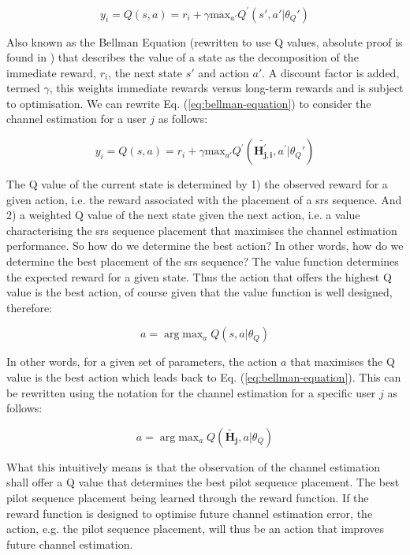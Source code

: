 \begin{equation}\label{eq:bellman-equation}
    y_i = Q(s, a) = r_i + \gamma \text{max}_{a'} Q^{'}(s', a' | \theta_Q')
\end{equation}

Also known as the Bellman Equation (rewritten to use Q values, absolute proof is found in \cite{Sutton2017ReinforcementSecond}) that describes the value of a state as the decomposition of the immediate reward, $r_i$, the next state $s'$ and action $a'$. A discount factor is added, termed $\gamma$, this weights immediate rewards versus long-term rewards and is subject to optimisation. We can rewrite Eq. (\ref{eq:bellman-equation}) to consider the channel estimation for a user $j$  as follows:

\begin{equation}\label{eq:value-function}
    y_i = Q(s, a) = r_i + \gamma \text{max}_{a'} Q^{'}(\mathbf{\widetilde{H_{j,i}^{'}}}, a^{'} | \theta_Q')
\end{equation}

The Q value of the current state is determined by 1) the observed reward for a given action, i.e. the reward associated with the placement of a \gls{srs} sequence. And 2) a weighted Q value of the next state given the next action, i.e. a value characterising the \gls{srs} sequence placement that maximises the channel estimation performance. So how do we determine the best action? In other words, how do we determine the best placement of the \gls{srs} sequence? The value function determines the expected reward for a given state. Thus the action that offers the highest Q value is the best action, of course given that the value function is well designed, therefore:

\begin{equation}\label{eq:critic-action}
    a = \arg \text{max}_{a} \; Q(s, a | \theta_Q)
\end{equation}

In other words, for a given set of parameters, the action $a$ that maximises the Q value is the best action which leads back to Eq. (\ref{eq:bellman-equation}). This can be rewritten using the notation for the channel estimation for a specific user $j$ as follows:

\begin{equation}\label{eq:critic-action}
    a = \arg \text{max}_{a} \; Q(\mathbf{\widetilde{H_{j}}}, a | \theta_Q)
\end{equation}

What this intuitively means is that the observation of the channel estimation shall offer a Q value that determines the best pilot sequence placement. The best pilot sequence placement being learned through the reward function. If the reward function is designed to optimise future channel estimation error, the action, e.g. the pilot sequence placement, will thus be an action that improves future channel estimation.

